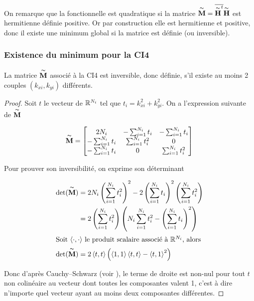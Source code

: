   On remarque que la fonctionnelle est quadratique si la matrice \(\overset{\thicksim}{\mathbf{M}}={\overline{\overset{\thicksim}{\mathbf{H}}^t}}\overset{\thicksim}{\mathbf{H}}\) est hermitienne définie positive. Or par construction elle est hermitienne et positive, donc il existe une minimum global si la matrice est définie (ou inversible). 

  \subsubsection{Existence du minimum pour la CI4}

  \begin{prop}
    La matrice \(\overset{\thicksim}{\mathbf{M}}\) associé à la CI4 est inversible, donc définie, s'il existe au moins 2 couples \((k_{xi},k_{yi})\) différents.
  \end{prop}

  \begin{proof}
    Soit \(t\) le vecteur de \(\mathbb R^{N_{i}}\) tel que \(t_i = k_{xi}^2 + k_{yi}^2\). On a l'expression suivante de \(\overset{\thicksim}{\mathbf{M}}\)

    \begin{equation}
      \overset{\thicksim}{\mathbf{M}} = \begin{bmatrix}
      2 N_{i} & -\sum_{i=1}^{N_{i}} t_i & -\sum_{i=1}^{N_{i}} t_i
      \\
      -\sum_{i=1}^{N_{i}} t_i & \sum_{i=1}^{N_{i}} t_i^2 & 0
      \\
      -\sum_{i=1}^{N_{i}} t_i & 0 & \sum_{i=1}^{N_{i}} t_i^2
      \end{bmatrix}
    \end{equation}

    Pour prouver son inversibilité, on exprime son déterminant 

    \begin{align}
      \det( \overset{\thicksim}{\mathbf{M}}) &= 2N_{i}\left(\sum_{i=1}^{N_{i}} t_i^2\right)^2 - 2 \left( \sum_{i=1}^{N_{i}} t_i\right)^2 \left(\sum_{i=1}^{N_{i}}t_i^2\right) 
      \\
      &= 2\left(\sum_{i=1}^{N_{i}} t_i^2\right)\left(N_{i}\sum_{i=1}^{N_{i}} t_i^2 - \left( \sum_{i=1}^{N_{i}} t_i\right)^2 \right)
      \\
      \intertext{Soit \(\left<\cdot,\cdot\right>\) le produit scalaire associé à \(\mathbb R^{N_{i}}\), alors}
      \det( \overset{\thicksim}{\mathbf{M}}) &= 2\left<t,t\right>\left( \left<1,1\right>\left<t,t\right>- \left<t,1\right>^2\right)
    \end{align}

    Donc d'après Cauchy–Schwarz (voir \cite[\href{https://dlmf.nist.gov/1.7\#E1}{eq.~1.7.1}]{dlmf_nist_2019}), le terme de droite est non-nul pour tout \(t\) non colinéaire au vecteur dont toutes les composantes valent 1, c'est à dire n'importe quel vecteur ayant au moins deux composantes différentes.
  \end{proof}


